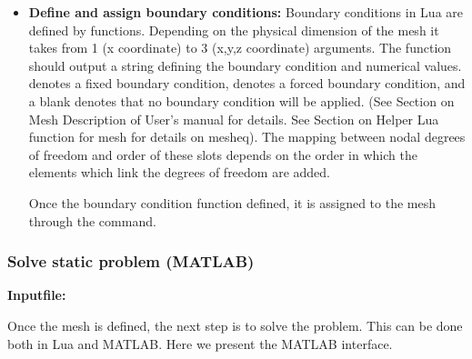 \begin{itemize}
  \item{\textbf{Define and assign boundary conditions:}}
  Boundary conditions in Lua are defined by functions. Depending
  on the physical dimension of the mesh it takes from 1 (x coordinate)
  to 3 (x,y,z coordinate) arguments. The function should output 
  a string defining the boundary condition and numerical values.
   denotes a fixed boundary condition,  denotes a 
  forced boundary condition, and a blank denotes that no boundary
  condition will be applied. (See Section on Mesh Description of
  User's manual for details. See Section on Helper Lua function for
  mesh for details on mesheq). The mapping between nodal degrees
  of freedom and order of these slots depends on the order in
  which the elements which link the degrees of freedom are 
  added. 

  Once the boundary condition function defined, it is assigned 
  to the mesh through the  command.

\end{itemize}

\clearpage
\subsubsection*{Solve static problem (MATLAB)}
\begin{flushleft}
  \textbf{Inputfile:}
  \\
\end{flushleft}
\hspace{1in}
{\footnotesize
{}
}

\clearpage
Once the mesh is defined, the next step is to solve the problem.
This can be done both in Lua and MATLAB. Here we present the MATLAB
interface. 

